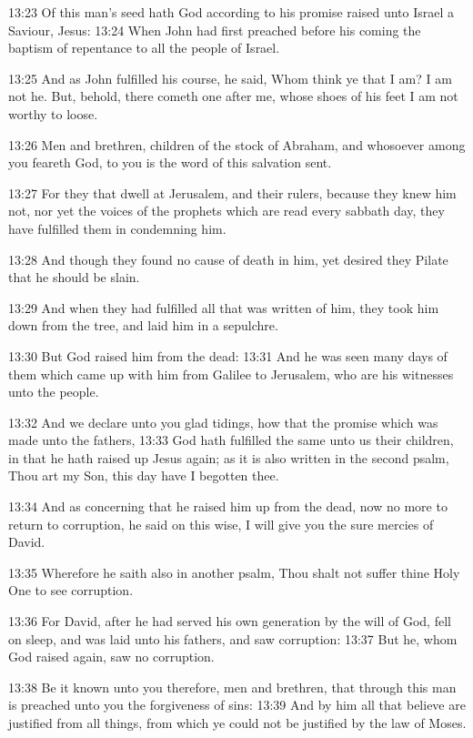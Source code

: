 13:23 Of this man's seed hath God according to his promise raised unto Israel a Saviour, Jesus: 13:24 When John had first preached before his coming the baptism of repentance to all the people of Israel.

13:25 And as John fulfilled his course, he said, Whom think ye that I am?  I am not he. But, behold, there cometh one after me, whose shoes of his feet I am not worthy to loose.

13:26 Men and brethren, children of the stock of Abraham, and whosoever among you feareth God, to you is the word of this salvation sent.

13:27 For they that dwell at Jerusalem, and their rulers, because they knew him not, nor yet the voices of the prophets which are read every sabbath day, they have fulfilled them in condemning him.

13:28 And though they found no cause of death in him, yet desired they Pilate that he should be slain.

13:29 And when they had fulfilled all that was written of him, they took him down from the tree, and laid him in a sepulchre.

13:30 But God raised him from the dead: 13:31 And he was seen many days of them which came up with him from Galilee to Jerusalem, who are his witnesses unto the people.

13:32 And we declare unto you glad tidings, how that the promise which was made unto the fathers, 13:33 God hath fulfilled the same unto us their children, in that he hath raised up Jesus again; as it is also written in the second psalm, Thou art my Son, this day have I begotten thee.

13:34 And as concerning that he raised him up from the dead, now no more to return to corruption, he said on this wise, I will give you the sure mercies of David.

13:35 Wherefore he saith also in another psalm, Thou shalt not suffer thine Holy One to see corruption.

13:36 For David, after he had served his own generation by the will of God, fell on sleep, and was laid unto his fathers, and saw corruption: 13:37 But he, whom God raised again, saw no corruption.

13:38 Be it known unto you therefore, men and brethren, that through this man is preached unto you the forgiveness of sins: 13:39 And by him all that believe are justified from all things, from which ye could not be justified by the law of Moses.

